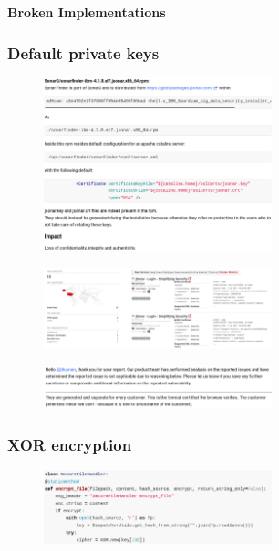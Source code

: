 \begin{frame}
  \begin{center}
    {\bf Broken Implementations}
  \end{center}
\end{frame}

\begin{frame}[allowframebreaks]
  \frametitle{Default private keys}
            \begin{figure}[h!]
              \includegraphics[width=250px]{./badpractice1.png}
            \end{figure}

            \begin{figure}[h!]
              \includegraphics[width=250px]{./badpractice3.png}
            \end{figure}

            \begin{figure}[h!]
              \includegraphics[width=250px]{./badpractice2.png}
            \end{figure}

\end{frame}

\begin{frame}
        \frametitle{XOR encryption}
            \begin{figure}[h!]
              \includegraphics[width=250px]{./xorencryption.png}
            \end{figure}
\end{frame}


